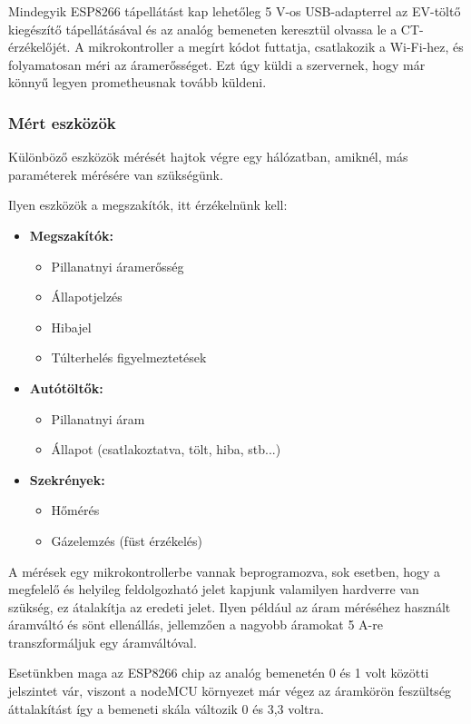 Mindegyik ESP8266 tápellátást kap lehetőleg 5 V-os USB-adapterrel az EV-töltő kiegészítő tápellátásával 
és az analóg bemeneten keresztül olvassa le a CT-érzékelőjét.
A mikrokontroller a megírt kódot futtatja, csatlakozik a Wi-Fi-hez, és folyamatosan méri az áramerősséget. 
Ezt úgy küldi a szervernek, hogy már könnyű legyen prometheusnak tovább küldeni.

\subsubsection{Mért eszközök}

Különböző eszközök mérését hajtok végre egy hálózatban, amiknél, más paraméterek mérésére van szükségünk.

Ilyen eszközök a megszakítók, itt érzékelnünk kell:
\begin{itemize}
    \item \textbf{Megszakítók:}
    \begin{itemize}
        \item Pillanatnyi áramerősség
        \item Állapotjelzés
        \item Hibajel
        \item Túlterhelés figyelmeztetések
    \end{itemize}
    \item \textbf{Autótöltők:}
    \begin{itemize}
        \item Pillanatnyi áram
        \item Állapot (csatlakoztatva, tölt, hiba, stb...)
    \end{itemize}
    \item \textbf{Szekrények:}
    \begin{itemize}
        \item Hőmérés
        \item Gázelemzés (füst érzékelés)
    \end{itemize}
\end{itemize}

A mérések egy mikrokontrollerbe vannak beprogramozva, sok esetben, 
hogy a megfelelő és helyileg feldolgozható jelet kapjunk valamilyen hardverre van szükség, ez átalakítja az eredeti jelet. 
Ilyen például az áram méréséhez használt áramváltó és sönt ellenállás, jellemzően a nagyobb áramokat 5 A-re transzformáljuk 
egy áramváltóval.

Esetünkben maga az ESP8266 chip az analóg bemenetén 0 és 1 volt közötti jelszintet vár, 
viszont a nodeMCU környezet már végez az áramkörön feszültség áttalakítást így a bemeneti skála változik 0 és 3,3 voltra.


